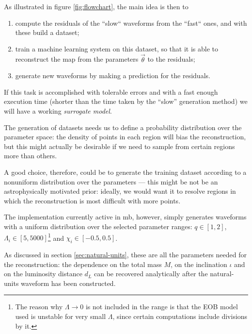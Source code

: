 \documentclass[main.tex]{subfiles}
\begin{document}
As illustrated in figure \ref{fig:flowchart}, the main idea is then to 
\begin{enumerate}
    \item compute the residuals of the ``slow`` waveforms from the ``fast`` ones, and with these build a dataset;
    \item train a machine learning system on this dataset, so that it is able to reconstruct the map from the parameters \(\vec{\theta}\) to the residuals;
    \item generate new waveforms by making a prediction for the residuals.
\end{enumerate}

If this task is accomplished with tolerable errors and with a fast enough execution time (shorter than the time taken by the ``slow'' generation method) we will have a working \emph{surrogate model}. 

The generation of datasets needs us to define a probability distribution over the parameter space: the density of points in each region will bias the reconstruction, but this might actually be desirable if we need to sample from certain regions more than others. 

A good choice, therefore, could be to generate the training dataset according to a nonuniform distribution over the parameters --- this might be not be an astrophysically motivated prior: ideally, we would want it to resolve regions in which the reconstruction is most difficult with more points.

The implementation currently active in \ac{mb}, however, simply generates waveforms with a uniform distribution over the selected parameter ranges: \(q \in [1, 2]\), \(\Lambda _i \in [5, 5000]\)\footnote{The reason why \(\Lambda \to 0\) is not included in the range is that the \ac{EOB} model used is unstable for very small \(\Lambda \), since certain computations include divisions by it.} and \(\chi_i \in [-0.5, 0.5]\).

As discussed in section \ref{sec:natural-units}, these are all the parameters needed for the reconstruction: the dependence on the total mass \(M\), on the inclination \(\iota \) and on the luminosity distance \(d_L\) can be recovered analytically after the natural-units waveform has been constructed.  

\end{document}
